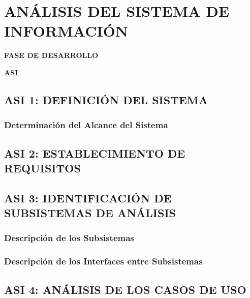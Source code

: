 \newpage
\chapter{ANÁLISIS DEL SISTEMA DE INFORMACIÓN}
	\vspace{2cm}	
	\begin{center}
	{\Large \textbf{FASE DE DESARROLLO} \par}
	\end{center}
	\vspace{5cm}
	
	\begin{center}
	\Huge \textbf{ASI}\par
	\end{center}

\newpage
\section{ASI 1: DEFINICIÓN DEL SISTEMA}

\subsection{Determinación del Alcance del Sistema}



\newpage
\section{ASI 2: ESTABLECIMIENTO DE REQUISITOS}




\newpage
\section{ASI 3: IDENTIFICACIÓN DE SUBSISTEMAS DE ANÁLISIS}

\subsection{Descripción de los Subsistemas} 

\subsection{Descripción de los Interfaces entre Subsistemas}


\newpage
\section{ASI 4: ANÁLISIS DE LOS CASOS DE USO}

